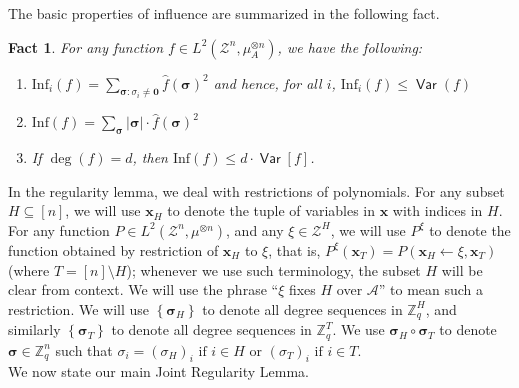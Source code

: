 \documentclass[11pt]{article}
\newcommand{\inbrace}[1]{\left \{ #1 \right \}}
\newcommand{\set}[1]{\inbrace{#1}}
\DeclareMathOperator*{\Var}{\mathsf{Var}}
\newcommand{\what}[1]{\widehat{#1}}
\newcommand{\bbZ}{{\mathbb Z}}
\newcommand{\bx}{{\bm x}}
\newcommand{\bsigma}{{\boldsymbol \sigma}}
\newcommand{\calA}{\mathcal{A}}
\newcommand{\calZ}{\mathcal{Z}}
\newcommand{\Inf}{\mathrm{Inf}}
\newtheorem{fact}[theorem]{Fact}
\begin{document}
\noindent The basic properties of influence are summarized in the following fact.

\begin{fact}\label{fact:influences}
	For any function $f \in L^2(\calZ^n, \mu_A^{\otimes n})$, we have the following:
	\begin{enumerate}
		\item[(i)] $\Inf_i(f) = \sum\limits_{\bsigma : \sigma_i \ne \mathbf{0}} \what{f}(\bsigma)^2$ and hence, for all $i$, $\Inf_i(f) \le \Var(f)$
		\item[(ii)] $\Inf(f) = \sum\limits_{\bsigma} |\bsigma| \cdot \what{f}(\bsigma)^2$
		\item[(iii)] If $\deg(f) = d$, then $\Inf(f) \le d \cdot \Var[f]$.
	\end{enumerate}
\end{fact}

\noindent In the regularity lemma, we deal with restrictions of polynomials. For any subset $H \subseteq [n]$, we will use $\bx_H$ to denote the tuple of variables in $\bx$ with indices in $H$. For any function $P \in L^2(\calZ^n, \mu^{\otimes n})$, and any $\xi \in \calZ^{H}$, we will use $P^{\xi}$ to denote the function obtained by restriction of $\bx_H$ to $\xi$, that is, $P^{\xi}(\bx_{T}) = P(\bx_H \gets \xi, \bx_T)$ (where $T = [n] \setminus H$); whenever we use such terminology, the subset $H$ will be clear from context.	We will use the phrase ``$\xi$ fixes $H$ over $\calA$'' to mean such a restriction. We will use $\set{\bsigma_H}$ to denote all degree sequences in $\bbZ_q^H$, and similarly $\set{\bsigma_T}$ to denote all degree sequences in $\bbZ_q^T$. We use $\bsigma_H \circ \bsigma_T$ to denote $\bsigma \in \bbZ_q^n$ such that $\sigma_i = (\sigma_H)_i \text{ if } i \in H \text{ or } (\sigma_T)_i \text{ if } i \in T$.\\

\noindent We now state our main Joint Regularity Lemma.
\end{document}
